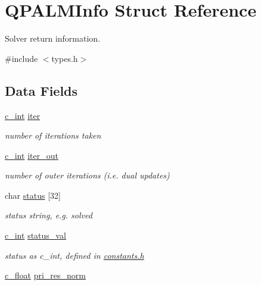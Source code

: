 \hypertarget{structQPALMInfo}{}\section{Q\+P\+A\+L\+M\+Info Struct Reference}
\label{structQPALMInfo}


Solver return information.  




{\ttfamily \#include $<$types.\+h$>$}

\subsection*{Data Fields}
\begin{DoxyCompactItemize}
\item 
\mbox{\hyperlink{global__opts_8h_aa3217a0f49d3e52b74e9dd830c44472f}{c\+\_\+int}} \mbox{\hyperlink{structQPALMInfo_a37deb2f191ee74eb42877aff5d31e44c}{iter}}
\begin{DoxyCompactList}\small\item\em number of iterations taken \end{DoxyCompactList}\item 
\mbox{\hyperlink{global__opts_8h_aa3217a0f49d3e52b74e9dd830c44472f}{c\+\_\+int}} \mbox{\hyperlink{structQPALMInfo_a10f2f0fd44923bdcc22951f9de27d391}{iter\+\_\+out}}
\begin{DoxyCompactList}\small\item\em number of outer iterations (i.\+e. dual updates) \end{DoxyCompactList}\item 
char \mbox{\hyperlink{structQPALMInfo_a50d560141016d6b0a0198feb84c4a835}{status}} \mbox{[}32\mbox{]}
\begin{DoxyCompactList}\small\item\em status string, e.\+g. \textquotesingle{}solved\textquotesingle{} \end{DoxyCompactList}\item 
\mbox{\hyperlink{global__opts_8h_aa3217a0f49d3e52b74e9dd830c44472f}{c\+\_\+int}} \mbox{\hyperlink{structQPALMInfo_a8e754dd1c46f6b40ea54fb7422764522}{status\+\_\+val}}
\begin{DoxyCompactList}\small\item\em status as c\+\_\+int, defined in \mbox{\hyperlink{constants_8h}{constants.\+h}} \end{DoxyCompactList}\item 
\mbox{\hyperlink{global__opts_8h_a7f1a9fda95e52979658c20a0d134fb15}{c\+\_\+float}} \mbox{\hyperlink{structQPALMInfo_a21e0db7fa16ec32656953c375dc01e3c}{pri\+\_\+res\+\_\+norm}}

\end{DoxyCompactItemize}
